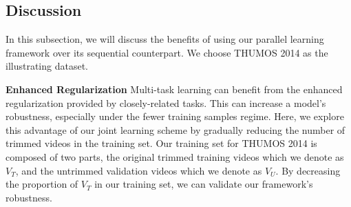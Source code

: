 \documentclass[10pt,twocolumn,letterpaper]{article}
\begin{document}
\begin{table}[t]
	\begin{minipage}{0.25\textwidth}%
		\centering
	\end{minipage}%
	\begin{minipage}{0.25\textwidth}%
		\centering
	\end{minipage}%
	\caption{Comparison between our parallel multi-task learning pipeline and its sequential counterpart in \cite{scnn_shou_wang_chang_cvpr16}. Our method is robust to large reductions in training data. Note the mAP here is reported using the updated evaluation toolkit.\label{tab:regularization}}
\end{table}


\subsection{Discussion}
In this subsection, we will discuss the benefits of using our parallel learning framework over its sequential counterpart. We choose THUMOS 2014 as the illustrating dataset. 

\noindent \textbf{Enhanced Regularization}
Multi-task learning can benefit from the enhanced regularization provided by closely-related tasks. This can increase a model's robustness, especially under the fewer training samples regime. Here, we explore this advantage of our joint learning scheme by gradually reducing the number of trimmed videos in the training set. Our training set for THUMOS 2014 is composed of two parts, the original trimmed training videos which we denote as $V_{T}$, and the untrimmed validation videos which we denote as $V_{U}$. By decreasing the proportion of $V_{T}$ in our training set, we can validate our framework's robustness.
\end{document}
